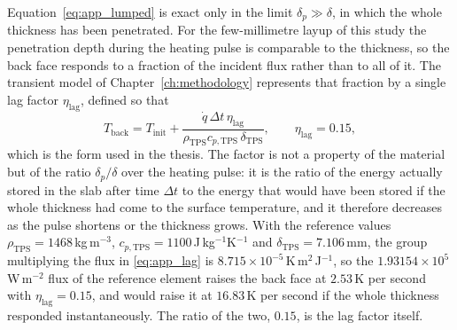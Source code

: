 Equation~\eqref{eq:app_lumped} is exact only in the limit $\delta_p \gg \delta$, in which the whole thickness has been penetrated. For the few-millimetre layup of this study the penetration depth during the heating pulse is comparable to the thickness, so the back face responds to a fraction of the incident flux rather than to all of it. The transient model of Chapter~\ref{ch:methodology} represents that fraction by a single lag factor $\eta_{\mathrm{lag}}$, defined so that
\begin{equation}
    T_{\mathrm{back}} = T_{\mathrm{init}} + \frac{\dot{q}\,\Delta t\,\eta_{\mathrm{lag}}}{\rho_{\mathrm{TPS}}c_{p,\mathrm{TPS}}\,\delta_{\mathrm{TPS}}} ,
    \qquad \eta_{\mathrm{lag}} = 0.15 ,
    \label{eq:app_lag}
\end{equation}
which is the form used in the thesis. The factor is not a property of the material but of the ratio $\delta_p/\delta$ over the heating pulse: it is the ratio of the energy actually stored in the slab after time $\Delta t$ to the energy that would have been stored if the whole thickness had come to the surface temperature, and it therefore decreases as the pulse shortens or the thickness grows. With the reference values $\rho_{\mathrm{TPS}} = 1468$\,kg\,m$^{-3}$, $c_{p,\mathrm{TPS}} = 1100$\,J\,kg$^{-1}$K$^{-1}$ and $\delta_{\mathrm{TPS}} = 7.106$\,mm, the group multiplying the flux in \eqref{eq:app_lag} is $8.715\times10^{-5}$\,K\,m$^{2}$\,J$^{-1}$, so the $1.93154\times10^5$\,W\,m$^{-2}$ flux of the reference element raises the back face at $2.53$\,K per second with $\eta_{\mathrm{lag}} = 0.15$, and would raise it at $16.83$\,K per second if the whole thickness responded instantaneously. The ratio of the two, $0.15$, is the lag factor itself.

